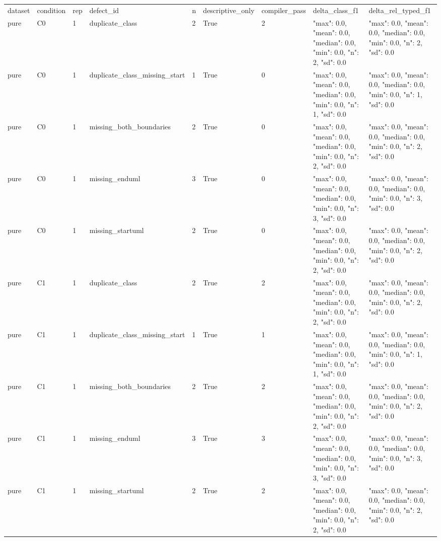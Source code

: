 \begin{tabular}{lllllllll}
dataset & condition & rep & defect\_id & n & descriptive\_only & compiler\_pass & delta\_class\_f1 & delta\_rel\_typed\_f1 \\
pure & C0 & 1 & duplicate\_class & 2 & True & 2 & {"max": 0.0, "mean": 0.0, "median": 0.0, "min": 0.0, "n": 2, "sd": 0.0} & {"max": 0.0, "mean": 0.0, "median": 0.0, "min": 0.0, "n": 2, "sd": 0.0} \\
pure & C0 & 1 & duplicate\_class\_missing\_start & 1 & True & 0 & {"max": 0.0, "mean": 0.0, "median": 0.0, "min": 0.0, "n": 1, "sd": 0.0} & {"max": 0.0, "mean": 0.0, "median": 0.0, "min": 0.0, "n": 1, "sd": 0.0} \\
pure & C0 & 1 & missing\_both\_boundaries & 2 & True & 0 & {"max": 0.0, "mean": 0.0, "median": 0.0, "min": 0.0, "n": 2, "sd": 0.0} & {"max": 0.0, "mean": 0.0, "median": 0.0, "min": 0.0, "n": 2, "sd": 0.0} \\
pure & C0 & 1 & missing\_enduml & 3 & True & 0 & {"max": 0.0, "mean": 0.0, "median": 0.0, "min": 0.0, "n": 3, "sd": 0.0} & {"max": 0.0, "mean": 0.0, "median": 0.0, "min": 0.0, "n": 3, "sd": 0.0} \\
pure & C0 & 1 & missing\_startuml & 2 & True & 0 & {"max": 0.0, "mean": 0.0, "median": 0.0, "min": 0.0, "n": 2, "sd": 0.0} & {"max": 0.0, "mean": 0.0, "median": 0.0, "min": 0.0, "n": 2, "sd": 0.0} \\
pure & C1 & 1 & duplicate\_class & 2 & True & 2 & {"max": 0.0, "mean": 0.0, "median": 0.0, "min": 0.0, "n": 2, "sd": 0.0} & {"max": 0.0, "mean": 0.0, "median": 0.0, "min": 0.0, "n": 2, "sd": 0.0} \\
pure & C1 & 1 & duplicate\_class\_missing\_start & 1 & True & 1 & {"max": 0.0, "mean": 0.0, "median": 0.0, "min": 0.0, "n": 1, "sd": 0.0} & {"max": 0.0, "mean": 0.0, "median": 0.0, "min": 0.0, "n": 1, "sd": 0.0} \\
pure & C1 & 1 & missing\_both\_boundaries & 2 & True & 2 & {"max": 0.0, "mean": 0.0, "median": 0.0, "min": 0.0, "n": 2, "sd": 0.0} & {"max": 0.0, "mean": 0.0, "median": 0.0, "min": 0.0, "n": 2, "sd": 0.0} \\
pure & C1 & 1 & missing\_enduml & 3 & True & 3 & {"max": 0.0, "mean": 0.0, "median": 0.0, "min": 0.0, "n": 3, "sd": 0.0} & {"max": 0.0, "mean": 0.0, "median": 0.0, "min": 0.0, "n": 3, "sd": 0.0} \\
pure & C1 & 1 & missing\_startuml & 2 & True & 2 & {"max": 0.0, "mean": 0.0, "median": 0.0, "min": 0.0, "n": 2, "sd": 0.0} & {"max": 0.0, "mean": 0.0, "median": 0.0, "min": 0.0, "n": 2, "sd": 0.0} \\

\end{tabular}
